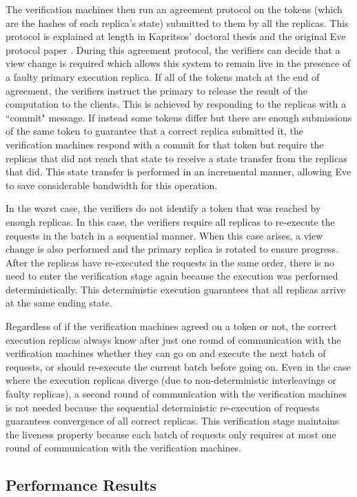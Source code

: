 \documentclass[11pt, oneside]{report}
\begin{document}
The verification machines then run an agreement protocol on the tokens (which are the hashes of each replica's state) submitted to them by all the replicas. This protocol is explained at length in Kapritsos' doctoral thesis and the original Eve protocol paper \cite{manosThesis, eve}.
During this agreement protocol, the verifiers can decide that a view change is required which allows this system to remain live in the presence of a faulty primary execution replica.
If all of the tokens match at the end of agreement, the verifiers instruct the primary to release the result of the computation to the clients.
This is achieved by responding to the replicas with a ``commit" message. 
If instead some tokens differ but there are enough submissions of the same token to guarantee that a correct replica submitted it, the verification machines respond with a commit for that token but require the replicas that did not reach that state to receive a state transfer from the replicas that did. 
This state transfer is performed in an incremental manner, allowing Eve to save considerable bandwidth for this operation.

In the worst case, the verifiers do not identify a token that was reached by enough replicas. 
In this case, the verifiers require all replicas to re-execute the requests in the batch in a sequential manner. 
When this case arises, a view change is also performed and the primary replica is rotated to ensure progress.
After the replicas have re-executed the requests in the same order, there is no need to enter the verification stage again because the execution was performed deterministically. 
This deterministic execution guarantees that all replicas arrive at the same ending state.

Regardless of if the verification machines agreed on a token or not, the correct execution replicas always know after just one round of communication with the verification machines whether they can go on and execute the next batch of requests, or should re-execute the current batch before going on. 
Even in the case where the execution replicas diverge (due to non-deterministic interleavings or faulty replicas), a second round of communication with the verification machines is not needed because the sequential deterministic re-execution of requests guarantees convergence of all correct replicas.
This verification stage maintains the liveness property because each batch of requests only requires at most one round of communication with the verification machines.

\subsection{Performance Results}\label{EveResults}
\end{document}
